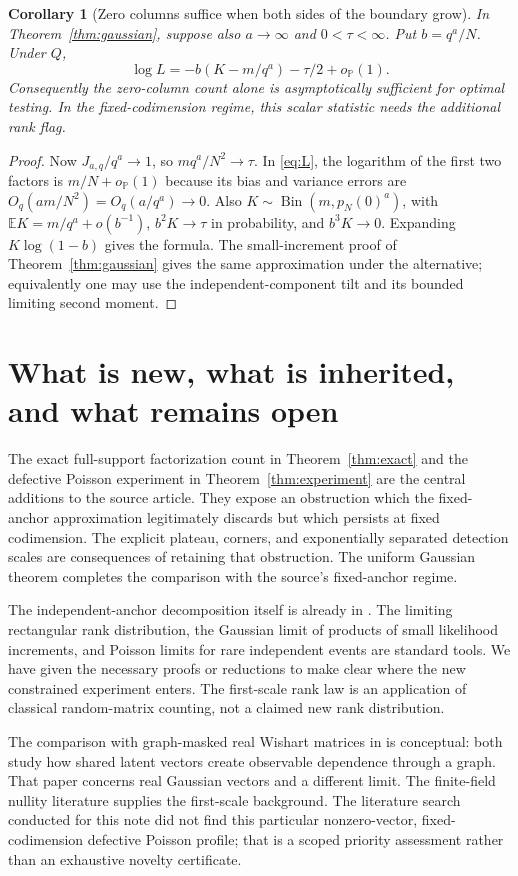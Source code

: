 \documentclass[11pt]{article}
\newtheorem{corollary}[theorem]{Corollary}
\theoremstyle{remark}\newtheorem{remark}[theorem]{Remark}
\newcommand{\Pp}{\mathbb P}
\newcommand{\E}{\mathbb E}
\newcommand{\Bin}{\operatorname{Bin}}
\begin{document}
\begin{corollary}[Zero columns suffice when both sides of the boundary grow]\label{cor:scalar}
In Theorem~\ref{thm:gaussian}, suppose also $a\to\infty$ and $0<\tau<\infty$. Put $b=q^a/N$. Under $Q$,
\[
 \log L=-b(K-m/q^a)-\tau/2+o_{\Pp}(1).
\]
Consequently the zero-column count alone is asymptotically sufficient for optimal testing. In the fixed-codimension regime, this scalar statistic needs the additional rank flag.
\end{corollary}

\begin{proof}
Now $J_{a,q}/q^a\to1$, so $mq^a/N^2\to\tau$. In \eqref{eq:L}, the logarithm of the first two factors is $m/N+o_{\Pp}(1)$ because its bias and variance errors are $O_q(am/N^2)=O_q(a/q^a)\to0$. Also $K\sim\Bin(m,p_N(0)^a)$, with $\E K=m/q^a+o(b^{-1})$, $b^2K\to\tau$ in probability, and $b^3K\to0$. Expanding $K\log(1-b)$ gives the formula. The small-increment proof of Theorem~\ref{thm:gaussian} gives the same approximation under the alternative; equivalently one may use the independent-component tilt and its bounded limiting second moment.
\end{proof}

\section{What is new, what is inherited, and what remains open}
The exact full-support factorization count in Theorem~\ref{thm:exact} and the defective Poisson experiment in Theorem~\ref{thm:experiment} are the central additions to the source article. They expose an obstruction which the fixed-anchor approximation legitimately discards but which persists at fixed codimension. The explicit plateau, corners, and exponentially separated detection scales are consequences of retaining that obstruction. The uniform Gaussian theorem completes the comparison with the source's fixed-anchor regime.

The independent-anchor decomposition itself is already in \cite{ProveIt}. The limiting rectangular rank distribution, the Gaussian limit of products of small likelihood increments, and Poisson limits for rare independent events are standard tools. We have given the necessary proofs or reductions to make clear where the new constrained experiment enters. The first-scale rank law is an application of classical random-matrix counting, not a claimed new rank distribution.

The comparison with graph-masked real Wishart matrices in \cite{BrennanBreslerHuang} is conceptual: both study how shared latent vectors create observable dependence through a graph. That paper concerns real Gaussian vectors and a different limit. The finite-field nullity literature \cite{FulmanGoldstein} supplies the first-scale background. The literature search conducted for this note did not find this particular nonzero-vector, fixed-codimension defective Poisson profile; that is a scoped priority assessment rather than an exhaustive novelty certificate.
\end{document}
